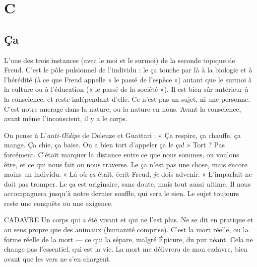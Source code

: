 
\chapter{C}

\section{Ça}
L’une des trois instances (avec le moi et le surmoi) de la seconde topique
de Freud. C’est le pôle pulsionnel de l'individu : le ça touche par là à la
biologie et à l’hérédité (à ce que Freud appelle « le passé de l’espèce ») autant
que le surmoi à la culture ou à l'éducation (« le passé de la société »). Il est bien
sûr antérieur à la conscience, et reste indépendant d’elle. Ce n’est pas un sujet,
ni une personne. C’est notre ancrage dans la nature, ou la nature en nous.
Avant la conscience, avant même l’inconscient, il y a le corps.

On pense à L'{\it anti-Œdipe} de Deleuze et Guattari : « Ça respire, ça chauffe,
ça mange. Ça chie, ça baise. On a bien tort d’appeler ça le ça! » Tort ? Pas
forcément. C’était marquer la distance entre ce que nous sommes, ou voulons
être, et ce qui nous fait ou nous traverse. Le ça n’est pas une chose, mais encore
moins un individu. « Là où {\it ça} était, écrit Freud, {\it je} dois advenir. » L’imparfait
ne doit pas tromper. Le ça est originaire, sans doute, mais tout aussi ultime. Il
nous accompagnera jusqu’à notre dernier souffle, qui sera le sien. Le sujet toujours
reste une conquête ou une exigence.

CADAVRE Un corps qui a été vivant et qui ne l’est plus. Ne se dit en pratique
et au sens propre que des animaux (humanité comprise).
C’est la mort réelle, ou la forme réelle de la mort — ce qui la sépare, malgré Épicure,
du pur néant. Cela ne change pas l'essentiel, qui est la vie. La mort me
délivrera de mon cadavre, bien avant que les vers ne s’en chargent.

